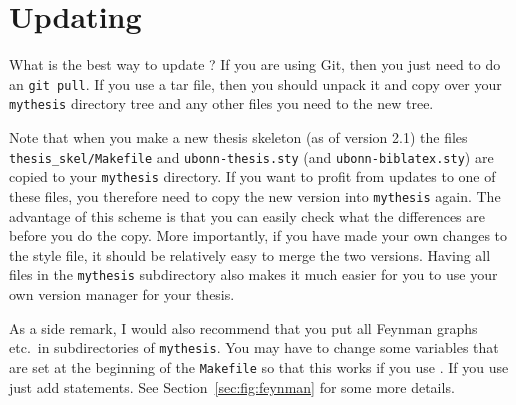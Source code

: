 \section{Updating }
\label{sec:tips:update}

What is the best way to update ? If you are
using Git, then you just need to do an \texttt{git pull}. If you use
a tar file, then you should unpack it and copy over your
\texttt{mythesis} directory tree and any other files you need to the new tree.

Note that when you make a new thesis skeleton (as of version 2.1) the files
\texttt{thesis\_skel/Makefile} and \texttt{ubonn-thesis.sty} 
(and \texttt{ubonn-biblatex.sty}) are copied
to your \texttt{mythesis} directory. If you want to profit from
updates to one of these files, you therefore need to copy the new
version into \texttt{mythesis} again. The advantage of this scheme is
that you can easily check what the differences are before you do the
copy. More importantly, if you have made your own changes to the style
file, it should be relatively easy to merge the two versions. Having
all files in the \texttt{mythesis} subdirectory also makes it much easier
for you to use your own version manager for your thesis.

As a side remark, I would also recommend that you put all Feynman
graphs etc.\ in subdirectories of \texttt{mythesis}. You may have to
change some variables that are set at the beginning of the
\texttt{Makefile} so that this works if you use . If
you use  just add  statements. See
Section~\ref{sec:fig:feynman} for some more details.


